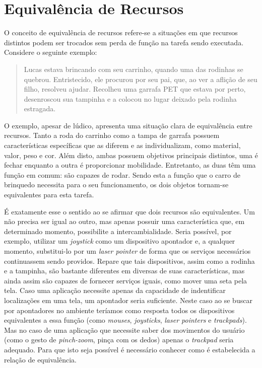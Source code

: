 \section{Equivalência de Recursos}
\label{sec:equivalenciaRecursos}

O conceito de equivalência de recursos refere-se a situações em que recursos distintos podem ser trocados sem perda de função na tarefa sendo executada. Considere o seguinte exemplo:

\begin{quote}
	Lucas estava brincando com seu carrinho, quando uma das rodinhas se quebrou. Entristecido, ele procurou por seu pai, que, ao ver a aflição de seu filho, resolveu ajudar. Recolheu uma garrafa PET que estava por perto, desenroscou sua tampinha e a colocou no lugar deixado pela rodinha estragada.
\end{quote}

O exemplo, apesar de lúdico, apresenta uma situação clara de equivalência entre recursos. Tanto a roda do carrinho como a tampa de garrafa possuem características específicas que as diferem e as individualizam, como material, valor, peso e cor. Além disto, ambas possuem objetivos principais distintos, uma é fechar enquanto a outra é proporcionar mobilidade. Entretanto, as duas têm uma função em comum: são capazes de rodar. Sendo esta a função que o carro de brinquedo necessita para o seu funcionamento, os dois objetos tornam-se equivalentes para esta tarefa.

É exatamente esse o sentido ao se afirmar que dois recursos são equivalentes. Um não precisa ser igual ao outro, mas apenas possuir uma característica que, em determinado momento, possibilite a intercambialidade. Seria possível, por exemplo, utilizar um \emph{joystick} como um dispositivo apontador e, a qualquer momento, substitui-lo por um \emph{laser pointer} de forma que os serviços necessários continuassem sendo providos. Repare que tais dispositivos, assim como a rodinha e a tampinha, são bastante diferentes em diversas de suas características, mas ainda assim são capazes de fornecer serviços iguais, como mover uma seta pela tela. Caso uma aplicação necessite apenas da capacidade de indentificar localizações em uma tela, um apontador seria suficiente. Neste caso ao se buscar por apontadores no ambiente teríamos como resposta todos os dispositivos equivalentes a essa função (como \emph{mouses}, \emph{joysticks}, \emph{laser pointers} e \emph{trackpads}). Mas no caso de uma aplicação que necessite saber dos movimentos do usuário (como o gesto de \emph{pinch-zoom}, pinça com os dedos) apenas o \emph{trackpad} seria adequado. Para que isto seja possível é necessário conhecer como é estabelecida a relação de equivalência.

